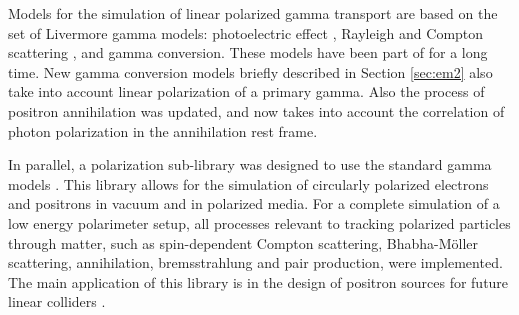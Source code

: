 Models for the simulation of linear polarized gamma transport are based 
on the set of Livermore gamma models: photoelectric effect \cite{embib:gamma9}, 
Rayleigh and Compton scattering \cite{embib:gamma10}, and gamma conversion. 
These models have been part of \Gfour{} for a long time.  New gamma conversion
models briefly described in Section \ref{sec:em2} also take into account linear
polarization of a primary gamma.  Also the process of positron annihilation was
updated, and now takes into account the correlation of photon polarization in 
the annihilation rest frame.

In parallel, a polarization sub-library was designed to use the standard 
gamma models \cite{embib:pol5}.  This library allows for the simulation of 
circularly polarized electrons and positrons in vacuum and in polarized media.
For a complete simulation of a low energy polarimeter setup, all processes
relevant to tracking polarized particles through matter, such as spin-dependent
Compton scattering, Bhabha-M\"{o}ller scattering, annihilation, bremsstrahlung
and pair production, were implemented.  The main application of this library is
in the design of positron sources for future linear colliders \cite{embib:pol6}.
